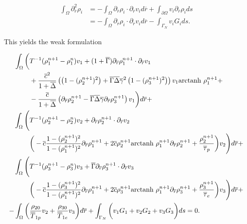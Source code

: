 \documentclass[%
oneside,                 %
final,                   %
10pt]{article}
\begin{document}
\begin{align}
	\int_\Omega \partial_{\overline{r}}^2 \rho_i
	&=
	-\int_\Omega \partial_{\overline{r}} \rho_i \cdot \partial_{\overline{r}} v_i d\overline{r} +
	\int_{\partial\Omega} v_i \partial_{\overline{r}} \rho_i ds
	\\
	&= 
	-\int_\Omega \partial_{\overline{r}} \rho_i \cdot \partial_{\overline{r}} v_i d\overline{r} -
	\int_{\Gamma_N} v_i G_i ds.
\end{align}

This yields the weak formulation

\begin{align}
	\int_\Omega \bigg( 
		&T^{-1} (\rho_1^{n+1}-\rho_1^n) v_1 +
		(1+\overline{\Gamma}) 
		\partial_{\overline{r}} \rho_1^{n+1} \cdot \partial_{\overline{r}} v_1 \nonumber \\
		&+ \frac{\overline{c}^2}{1+\overline{\Delta}}
		\left(
			\left(
				1 - (\rho_2^{n+1})^2
			\right)
			+
			\overline{\Gamma}\overline{\Delta}\overline{\gamma}^2
			\left(
				1 - (\rho_3^{n+1})^2
			\right)
		\right)
		v_1
		\text{arctanh }\rho_1^{n+1} + 
		\nonumber\\
		&-\frac{\overline{c}}{1+\overline{\Delta}}
		\left(
			\partial_{\overline{r}} \rho_2^{n+1} - \overline{\Gamma}\overline{\Delta}\overline{\gamma} \partial_{\overline{r}} \rho_3^{n+1}
		\right) v_1 
	\bigg) d\overline{r} + \nonumber\\
	\int_\Omega \Bigg(
		&T^{-1} (\rho_2^{n+1}-\rho_2^n) v_2
		+\partial_{\overline{r}} \rho_2^{n+1} \cdot \partial_{\overline{r}} v_2 \nonumber \\
		&\bigg(
		  -\overline{c} \frac{1-(\rho_2^{n+1})^2}{1-(\rho_1^{n+1})^2} \partial_{\overline{r}}\rho_1^{n+1}
		  + 2 \overline{c} \rho_2^{n+1} \text{arctanh }\rho_1^{n+1} \partial_{\overline{r}}\rho_2^{n+1}
		  + \dfrac{\rho_2^{n+1}}{\overline{\tau}_p}
		\bigg)
		v_2
	\Bigg) d\overline{r} + \nonumber\\
	\int_\Omega \Bigg(
		&T^{-1} (\rho_3^{n+1}-\rho_3^n) v_3 
		+\overline{\Gamma}\partial_{\overline{r}} \rho_3^{n+1} \cdot \partial_{\overline{r}} v_3 \nonumber \\
		&\bigg(
		  -\overline{c} \frac{1-(\rho_3^{n+1})^2}{1-(\rho_1^{n+1})^2} \partial_{\overline{r}}\rho_1^{n+1}
		  + 2 \overline{c} \rho_3^{n+1} \text{arctanh }\rho_1^{n+1} \partial_{\overline{r}}\rho_3^{n+1} 
		  + \dfrac{\rho_3^{n+1}}{\overline{\tau}_e}
		\bigg)
		v_3 
	\Bigg)
	d\overline{r} + \nonumber\\
	-\int_\Omega \bigg(
		&\dfrac{\rho_{20}}{\overline{T}_{1p}} v_2 +
		\dfrac{\rho_{30}}{\overline{T}_{1e}} v_3	
	\bigg)
	d\overline{r}
	+\int_{\Gamma_N} \bigg(
		v_1 G_1 + v_2 G_2 + v_3 G_3
	\bigg)
	ds
	= 0.
\end{align}








\end{document}
